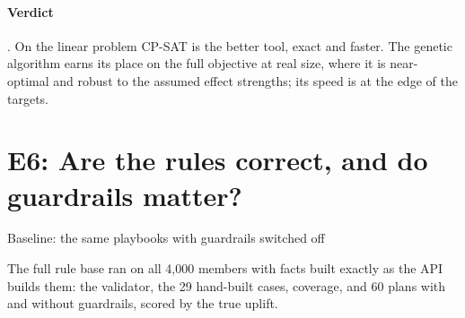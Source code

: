 \paragraph{Verdict} . On the linear problem CP-SAT is the better tool, exact and faster. The genetic algorithm earns its place on the full objective at real size, where it is near-optimal and robust to the assumed effect strengths; its speed is at the edge of the targets.

\section{E6: Are the rules correct, and do guardrails matter?}
\label{sec:e6}
\quad\textsf{\small Baseline: the same playbooks with guardrails switched off}

The full rule base ran on all 4,000 members with facts built exactly as the API builds them: the validator, the 29 hand-built cases, coverage, and 60 plans with and without guardrails, scored by the true uplift.

